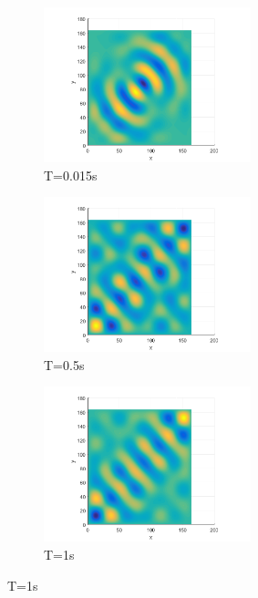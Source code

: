 \begin{figure}[h]
\begin{subfigure}{0.3 \textwidth}
	\centering
	\includegraphics[width=6cm]{./Chapter_4/_Figs/Dipole001_5point_160Hz_L10m_8000Fs.png}
	\caption{T=0.015s}
\end{subfigure}
\begin{subfigure}{0.3 \textwidth}
	\centering
	\includegraphics[width=6cm]{./Chapter_4/_Figs/Dipole05_5point_160Hz_L10m_8000Fs.png}
	\caption{T=0.5s}
\end{subfigure}
\begin{subfigure}{0.3 \textwidth}
	\centering
	\includegraphics[width=6cm]{./Chapter_4/_Figs/Dipole1_5point_160Hz_L10m_8000Fs.png}
	\caption{T=1s}
\end{subfigure}
\label{figs:dipole}
\end{figure}

